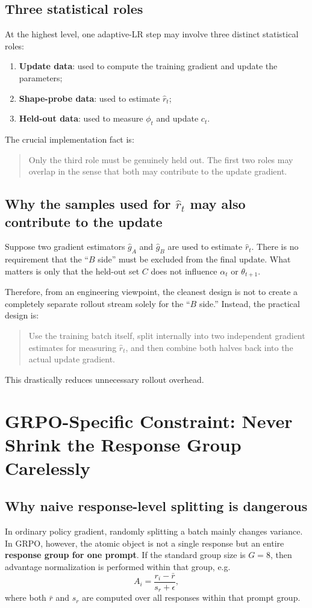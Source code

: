 \documentclass[11pt,a4paper]{article}
\newcommand{\ghat}{\hat g}
\newcommand{\rhat}{\hat r_t}
\newcommand{\phit}{\phi_t}
\begin{document}
\subsection{Three statistical roles}
At the highest level, one adaptive-LR step may involve three distinct statistical roles:
\begin{enumerate}[label=\arabic*., leftmargin=2em]
    \item \textbf{Update data}: used to compute the training gradient and update the parameters;
    \item \textbf{Shape-probe data}: used to estimate $\rhat$;
    \item \textbf{Held-out data}: used to measure $\phit$ and update $c_t$.
\end{enumerate}
The crucial implementation fact is:
\begin{quote}
Only the third role must be genuinely held out. The first two roles may overlap in the sense that both may contribute to the update gradient.
\end{quote}

\subsection{Why the samples used for $\rhat$ may also contribute to the update}
Suppose two gradient estimators $\ghat_A$ and $\ghat_B$ are used to estimate $\rhat$. There is no requirement that the ``$B$ side'' must be excluded from the final update. What matters is only that the held-out set $C$ does not influence $\alpha_t$ or $\theta_{t+1}$.

Therefore, from an engineering viewpoint, the cleanest design is not to create a completely separate rollout stream solely for the ``$B$ side.'' Instead, the practical design is:
\begin{quote}
Use the training batch itself, split internally into two independent gradient estimates for measuring $\rhat$, and then combine both halves back into the actual update gradient.
\end{quote}
This drastically reduces unnecessary rollout overhead.

\section{GRPO-Specific Constraint: Never Shrink the Response Group Carelessly}
\subsection{Why naive response-level splitting is dangerous}
In ordinary policy gradient, randomly splitting a batch mainly changes variance. In GRPO, however, the atomic object is not a single response but an entire \textbf{response group for one prompt}. If the standard group size is $G=8$, then advantage normalization is performed within that group, e.g.
\begin{equation}
A_i = \frac{r_i - \bar r}{s_r + \epsilon},
\end{equation}
where both $\bar r$ and $s_r$ are computed over all responses within that prompt group.
\end{document}
